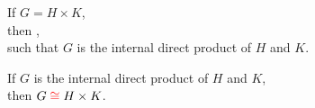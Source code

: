 
\begin{frame}{}
  \begin{center}
  \end{center}

\end{frame}

\begin{frame}{}
  \begin{theorem}
	\begin{center}
	  If $G = H \times K$, \\[5pt]
	  then , \\[5pt]
	  such that $G$ is the internal direct product of $H$ and $K$.
	\end{center}
  \end{theorem}


  \begin{theorem}
	\begin{center}
	  If $G$ is the internal direct product of $H$ and $K$, \\[5pt]
	  then $G \;\textcolor{red}{\cong}\; H \times K$.
	\end{center}
  \end{theorem}
\end{frame}
